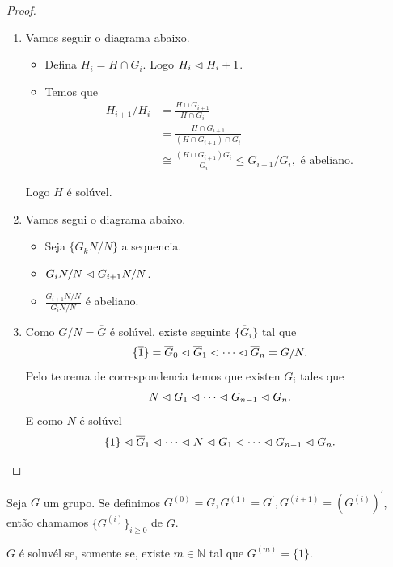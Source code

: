 \begin{proof} 
  \begin{enumerate}
    \item Vamos seguir o diagrama abaixo.\\
      \begin{center}
          
      \end{center}
      \begin{itemize}
        \item Defina $H_i=H\cap G_i$. Logo $H_i\vartriangleleft H_i+1$.
        \item Temos que
          \begin{align*}
            H_{i+1}/H_{i}&=\frac{H\cap G_{i+1}}{H\cap G_i}\\
            &=\frac{H\cap G_{i+1}}{(H\cap G_{i+1})\cap G_{i}}\\
            &\cong \frac{(H\cap G_{i+1})G_{i}}{G_i} \leq G_{i+1}/G_{i}, \text{ é abeliano}.
          \end{align*}
      \end{itemize}
      Logo $H$ é solúvel.
    \item Vamos segui o diagrama abaixo.\\
      \begin{center}  
          
      \end{center}
      \begin{itemize}
        \item Seja $\{G_kN/N\}$ a sequencia.
        \item $G_iN/N\vartriangleleft G_{i+1}N/N$.
        \item $\frac{G_{i+1}N/N}{G_iN/N}$ é abeliano. 
      \end{itemize}
    \item Como $G/N=\overline{G}$  é solúvel, existe seguinte $\{\overline{G}_i\}$ tal que
      $$\{\overline{1}\}=\overline{G}_0\vartriangleleft \overline{G}_1\vartriangleleft \cdots\vartriangleleft \overline{G}_n=G/N.$$
      Pelo teorema de correspondencia temos que existen $G_i$ tales que
      $$N\vartriangleleft G_1\vartriangleleft \cdots\vartriangleleft G_{n-1}\vartriangleleft G_n.$$
      E como $N$ é solúvel
      $$\{1\}\vartriangleleft \overline{G}_1\vartriangleleft\cdots\vartriangleleft N\vartriangleleft G_1\vartriangleleft \cdots\vartriangleleft G_{n-1}\vartriangleleft G_n.$$
  \end{enumerate}
\end{proof}
\begin{definition}
  Seja $G$ um grupo. Se definimos $G^{(0)}=G,G^{(1)}=G^{\prime},G^{(i+1)}=(G^{(i)})^{\prime}$, então chamamos $\{G^{(i)}\}_{i\geq 0}$  de $G$. 
\end{definition}
\begin{proposition}
  $G$ é soluvél se, somente se, existe $m\in\mathbb{N}$ tal que $G^{(m)}=\{1\}$. 
\end{proposition}
